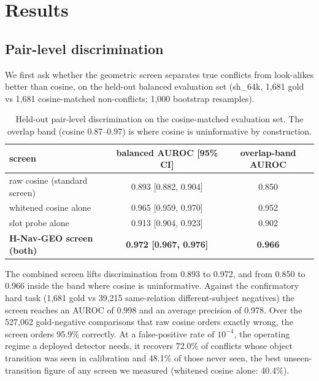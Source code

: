 \documentclass[journal=jcisd8,manuscript=article]{achemso}
\begin{document}
\section{Results}
\label{sec:results}

\subsection{Pair-level discrimination}

We first ask whether the geometric screen separates true conflicts from look-alikes better than cosine, on the held-out balanced evaluation set (sh\_64k, 1,681 gold vs 1,681 cosine-matched non-conflicts; 1,000 bootstrap resamples).

\begin{table}[H]\centering
\caption{Held-out pair-level discrimination on the cosine-matched evaluation set. The overlap band (cosine 0.87--0.97) is where cosine is uninformative by construction.}
\begin{tabular}{lcc}\toprule
screen & balanced AUROC [95\% CI] & overlap-band AUROC\\\midrule
raw cosine (standard screen) & 0.893 [0.882, 0.904] & 0.850\\
whitened cosine alone & 0.965 [0.959, 0.970] & 0.952\\
slot probe alone & 0.913 [0.904, 0.923] & 0.902\\
\textbf{H-Nav-GEO screen (both)} & \textbf{0.972 [0.967, 0.976]} & \textbf{0.966}\\\bottomrule
\end{tabular}\label{tab:pairlevel}\end{table}

The combined screen lifts discrimination from 0.893 to 0.972, and from 0.850 to 0.966 inside the band where cosine is uninformative. Against the confirmatory hard task (1,681 gold vs 39,215 same-relation different-subject negatives) the screen reaches an AUROC of 0.998 and an average precision of 0.978. Over the 527,062 gold-negative comparisons that raw cosine orders exactly wrong, the screen orders 95.9\% correctly. At a false-positive rate of $10^{-4}$, the operating regime a deployed detector needs, it recovers 72.0\% of conflicts whose object transition was seen in calibration and 48.1\% of those never seen, the best unseen-transition figure of any screen we measured (whitened cosine alone: 40.4\%).

\end{document}
